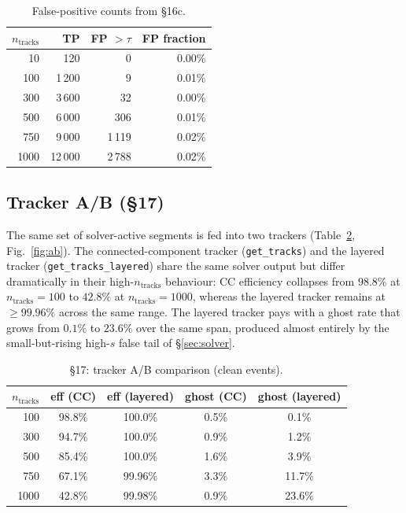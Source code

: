 \documentclass[11pt,a4paper]{article}
\newcommand{\nt}{n_\text{tracks}}
\begin{document}
\begin{table}[t]
  \centering
  \caption{False-positive counts from \S16c.\label{tab:fp}}
  \begin{tabular}{rrrr}
    \toprule
    $\nt$ & TP & FP $>\tau$ & FP fraction \\
    \midrule
    10   & 120    & 0    & 0.00\% \\
    100  & 1\,200  & 9    & 0.01\% \\
    300  & 3\,600  & 32   & 0.00\% \\
    500  & 6\,000  & 306  & 0.01\% \\
    750  & 9\,000  & 1\,119 & 0.02\% \\
    1000 & 12\,000 & 2\,788 & 0.02\% \\
    \bottomrule
  \end{tabular}
\end{table}

\subsection{Tracker A/B (\S17)}\label{sec:ab}
The same set of solver-active segments is fed into two trackers
(Table~\ref{tab:ab}, Fig.~\ref{fig:ab}). The connected-component
tracker (\texttt{get\_tracks}) and the layered tracker
(\texttt{get\_tracks\_layered}) share the same solver output but
differ dramatically in their high-$\nt$ behaviour: CC efficiency
collapses from $98.8\%$ at $\nt=100$ to $42.8\%$ at $\nt=1000$,
whereas the layered tracker remains at $\geq 99.96\%$ across the same
range. The layered tracker pays with a ghost rate that grows from
$0.1\%$ to $23.6\%$ over the same span, produced almost entirely by
the small-but-rising high-$s$ false tail of
\S\ref{sec:solver}.

\begin{table}[t]
  \centering
  \caption{\S17: tracker A/B comparison (clean events).\label{tab:ab}}
  \begin{tabular}{rcccc}
    \toprule
    $\nt$ & eff (CC) & eff (layered) & ghost (CC) & ghost (layered) \\
    \midrule
    100  & 98.8\% & 100.0\% & 0.5\% & 0.1\% \\
    300  & 94.7\% & 100.0\% & 0.9\% & 1.2\% \\
    500  & 85.4\% & 100.0\% & 1.6\% & 3.9\% \\
    750  & 67.1\% & 99.96\% & 3.3\% & 11.7\% \\
    1000 & 42.8\% & 99.98\% & 0.9\% & 23.6\% \\
    \bottomrule
  \end{tabular}
\end{table}
\end{document}
